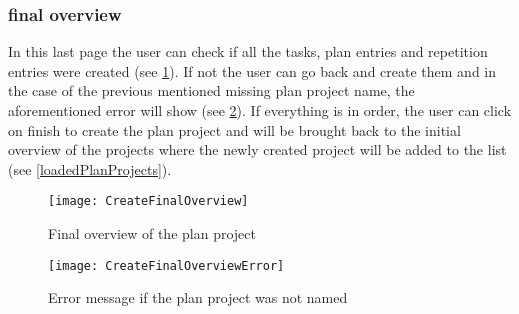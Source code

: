 \subsubsection{final overview}
In this last page the user can check if all the tasks, plan entries and repetition entries were created (see \ref{createFinalOverview}). If not the user can go back and create them and in the case of the previous mentioned missing plan project name, the aforementioned error will show (see \ref{createFinalOverviewError}). If everything is in order, the user can click on finish to create the plan project and will be brought back to the initial overview of the projects where the newly created project will be added to the list (see \ref{loadedPlanProjects}).
\begin{figure}[H]
	\centering
	\texttt{[image: CreateFinalOverview]}
	\caption{Final overview of the plan project}
	\label{createFinalOverview}
\end{figure}
\begin{figure}[H]
	\centering
	\texttt{[image: CreateFinalOverviewError]}
	\caption{Error message if the plan project was not named}
	\label{createFinalOverviewError}
\end{figure}